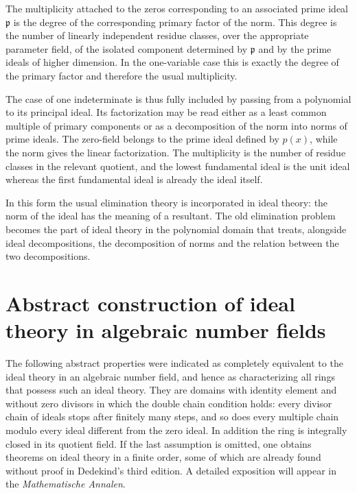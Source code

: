 \documentclass[12pt]{article}
\begin{document}
The multiplicity attached to the zeros corresponding to an associated prime ideal $\mathfrak p$ is the degree of the corresponding primary factor of the norm. This degree is the number of linearly independent residue classes, over the appropriate parameter field, of the isolated component determined by $\mathfrak p$ and by the prime ideals of higher dimension. In the one-variable case this is exactly the degree of the primary factor and therefore the usual multiplicity.

The case of one indeterminate is thus fully included by passing from a polynomial to its principal ideal. Its factorization may be read either as a least common multiple of primary components or as a decomposition of the norm into norms of prime ideals. The zero-field belongs to the prime ideal defined by $p(x)$, while the norm gives the linear factorization. The multiplicity is the number of residue classes in the relevant quotient, and the lowest fundamental ideal is the unit ideal whereas the first fundamental ideal is already the ideal itself.

In this form the usual elimination theory is incorporated in ideal theory: the norm of the ideal has the meaning of a resultant. The old elimination problem becomes the part of ideal theory in the polynomial domain that treats, alongside ideal decompositions, the decomposition of norms and the relation between the two decompositions.

\newpage

\section{Abstract construction of ideal theory in algebraic number fields}

The following abstract properties were indicated as completely equivalent to the ideal theory in an algebraic number field, and hence as characterizing all rings that possess such an ideal theory. They are domains with identity element and without zero divisors in which the double chain condition holds: every divisor chain of ideals stops after finitely many steps, and so does every multiple chain modulo every ideal different from the zero ideal. In addition the ring is integrally closed in its quotient field. If the last assumption is omitted, one obtains theorems on ideal theory in a finite order, some of which are already found without proof in Dedekind's third edition. A detailed exposition will appear in the \emph{Mathematische Annalen}.
\end{document}
